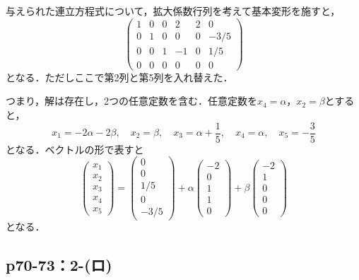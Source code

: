 \documentclass[a4paper,10pt,fleqn]{ltjsarticle}
\begin{document}
\begin{tleftbar}
    与えられた連立方程式について，拡大係数行列を考えて基本変形を施すと，
    \[
        \begin{pmatrix} 1 & 0 & 0 & 2 & 2 & 0 \\ 0 & 1& 0 & 0 & 0 & -3/5 \\ 0 & 0 & 1 & -1 & 0 & 1/5 \\ 0 & 0 & 0 & 0 & 0 & 0 \end{pmatrix}
    \]
    となる．ただしここで第2列と第5列を入れ替えた．

    つまり，解は存在し，2つの任意定数を含む．任意定数を$x_4 = \alpha$，$x_2 = \beta $とすると，
    \[
        x_1 = -2 \alpha - 2 \beta , \quad x_2 =\beta , \quad x_3 = \alpha + \frac{1}{5} , \quad x_4 = \alpha , \quad x_5 = -\frac{3}{5}
    \]
    となる．ベクトルの形で表すと
    \[
        \begin{pmatrix} x_1 \\ x_2 \\ x_3 \\ x_4 \\ x_5 \end{pmatrix}= \begin{pmatrix} 0 \\ 0 \\ 1/5 \\ 0 \\ -3/5 \end{pmatrix} + \alpha \begin{pmatrix} -2 \\ 0 \\ 1 \\ 1 \\ 0 \end{pmatrix} + \beta \begin{pmatrix} -2 \\ 1 \\ 0 \\ 0 \\ 0 \end{pmatrix}
    \]
    となる．
\end{tleftbar}

\subsection*{p70-73：2-(ロ)}
\end{document}
